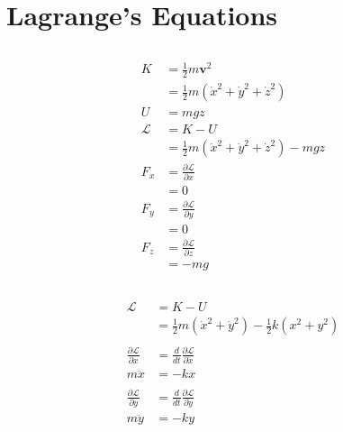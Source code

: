 \documentclass{article}
\renewcommand{\vec}[1]{\boldsymbol{\mathbf{#1}}}
\begin{document}
\section{Lagrange's Equations}

\subsection{}

\begin{align*}
  K           & = \frac{1}{2} m \vec{v}^2                                   \\
              & = \frac{1}{2} m (\dot{x}^2 + \dot{y}^2 + \dot{z}^2)         \\
  U           & = m g z                                                     \\
  \mathcal{L} & = K - U                                                     \\
              & = \frac{1}{2} m (\dot{x}^2 + \dot{y}^2 + \dot{z}^2) - m g z \\
  F_x         & = \frac{\partial \mathcal{L}}{\partial x}                   \\
              & = 0                                                         \\
  F_y         & = \frac{\partial \mathcal{L}}{\partial y}                   \\
              & = 0                                                         \\
  F_z         & = \frac{\partial \mathcal{L}}{\partial z}                   \\
              & = -m g
\end{align*}

\setcounter{subsection}{2}
\subsection{}

\begin{align*}
  \mathcal{L}                             & = K - U                                                             \\
                                          & = \frac{1}{2} m (\dot{x}^2 + \dot{y}^2) - \frac{1}{2} k (x^2 + y^2) \\ \\
  \frac{\partial \mathcal{L}}{\partial x} & = \frac{d}{d t} \frac{\partial \mathcal{L}}{\partial \dot{x}}       \\
  m \ddot{x}                              & = -k x                                                              \\ \\
  \frac{\partial \mathcal{L}}{\partial y} & = \frac{d}{d t} \frac{\partial \mathcal{L}}{\partial \dot{y}}       \\
  m \ddot{y}                              & = -k y
\end{align*}
\end{document}
